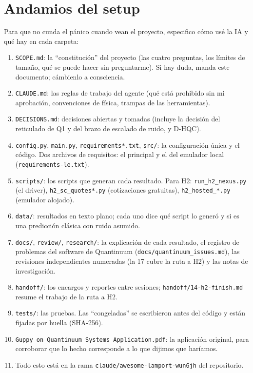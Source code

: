 \documentclass[11pt,a4paper]{article}
\begin{document}
\section{Andamios del setup}
Para que no cunda el p\'anico cuando vean el proyecto, especifico c\'omo us\'e la IA y qu\'e hay en cada carpeta:
\begin{enumerate}
  \item \texttt{SCOPE.md}: la ``constituci\'on'' del proyecto (las cuatro preguntas, los l\'imites de tama\~no, qu\'e se
    puede hacer sin preguntarme). Si hay duda, manda este documento; c\'ambienlo a consciencia.
  \item \texttt{CLAUDE.md}: las reglas de trabajo del agente (qu\'e est\'a prohibido sin mi aprobaci\'on, convenciones de
    f\'isica, trampas de las herramientas).
  \item \texttt{DECISIONS.md}: decisiones abiertas y tomadas (incluye la decisi\'on del reticulado de Q1 y del brazo de escalado de ruido, y D-HQC).
  \item \texttt{config.py}, \texttt{main.py}, \texttt{requirements*.txt}, \texttt{src/}: la configuraci\'on \'unica y el
    c\'odigo. Dos archivos de requisitos: el principal y el del emulador local (\texttt{requirements-le.txt}).
  \item \texttt{scripts/}: los scripts que generan cada resultado. Para H2: \texttt{run\_h2\_nexus.py} (el driver),
    \texttt{h2\_sc\_quotes*.py} (cotizaciones gratuitas), \texttt{h2\_hosted\_*.py} (emulador alojado).
  \item \texttt{data/}: resultados en texto plano; cada uno dice qu\'e script lo gener\'o y si es una predicci\'on cl\'asica con ruido asumido.
  \item \texttt{docs/}, \texttt{review/}, \texttt{research/}: la explicaci\'on de cada resultado, el registro de problemas del software de Quantinuum (\texttt{docs/quantinuum\_issues.md}), las revisiones
    independientes numeradas (la 17 cubre la ruta a H2) y las notas de investigaci\'on.
  \item \texttt{handoff/}: los encargos y reportes entre sesiones; \texttt{handoff/14-h2-finish.md} resume el trabajo de la ruta a H2.
  \item \texttt{tests/}: las pruebas. Las ``congeladas'' se escribieron antes del c\'odigo y est\'an fijadas por huella (SHA-256).
  \item \texttt{Guppy on Quantinuum Systems Application.pdf}: la aplicaci\'on original, para corroborar que lo hecho corresponde a lo que dijimos que har\'iamos.
  \item Todo esto est\'a en la rama \texttt{claude/awesome-lamport-wun6jh} del repositorio.
\end{enumerate}
\end{document}
